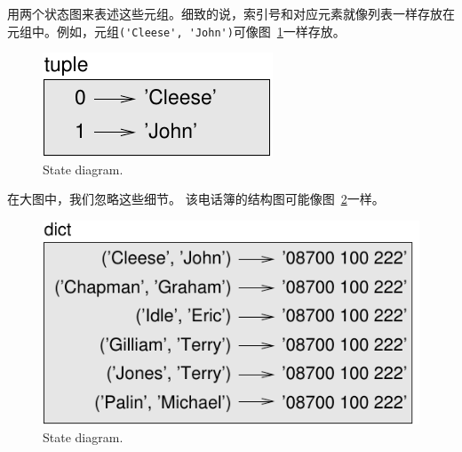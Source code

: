 
用两个状态图来表述这些元组。细致的说，索引号和对应元素就像列表一样存放在元组中。例如，元组\lstinline{('Cleese', 'John')}可像图~\ref{fig.tuple1}一样存放。
 

\begin{figure}
\centerline
{\includegraphics[scale=0.8]{../source/figs/tuple1.pdf}}
\caption{State diagram.}
\label{fig.tuple1}
\end{figure}


在大图中，我们忽略这些细节。 该电话簿的结构图可能像图~\ref{fig.dict2}一样。

\begin{figure}
\centerline
{\includegraphics[scale=0.8]{../source/figs/dict2.pdf}}
\caption{State diagram.}
\label{fig.dict2}
\end{figure}


